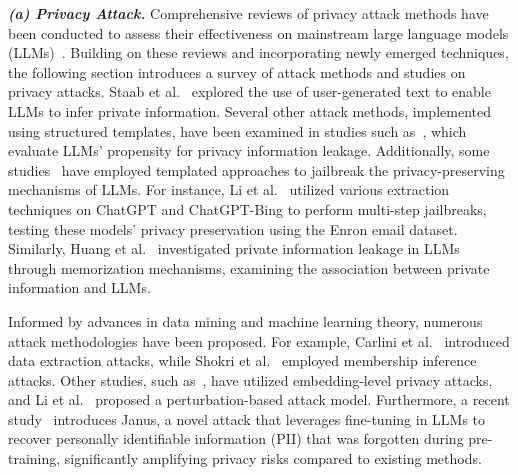 \textbf{\textit{(a) Privacy Attack.}} Comprehensive reviews of privacy attack methods have been conducted to assess their effectiveness on mainstream large language models (LLMs)~\cite{Das2024SecurityAP, Wang2024UniqueSA, Smith2023IdentifyingAM}. Building on these reviews and incorporating newly emerged techniques, the following section introduces a survey of attack methods and studies on privacy attacks. Staab et al.~\cite{Staab2023BeyondMV} explored the use of user-generated text to enable LLMs to infer private information. Several other attack methods, implemented using structured templates, have been examined in studies such as~\cite{Huang2022AreLP, Kim2023ProPILEPP, wang2023decodingtrust}, which evaluate LLMs' propensity for privacy information leakage. Additionally, some studies~\cite{Li2023MultistepJP, Deng2023JailbreakerAJ} have employed templated approaches to jailbreak the privacy-preserving mechanisms of LLMs. For instance, Li et al.~\cite{Li2023MultistepJP} utilized various extraction techniques on ChatGPT and ChatGPT-Bing to perform multi-step jailbreaks, testing these models' privacy preservation using the Enron email dataset. Similarly, Huang et al.~\cite{Huang2022AreLP} investigated private information leakage in LLMs through memorization mechanisms, examining the association between private information and LLMs.

Informed by advances in data mining and machine learning theory, numerous attack methodologies have been proposed. For example, Carlini et al.~\cite{carlini2021extracting} introduced data extraction attacks, while Shokri et al.~\cite{Shokri2016MembershipIA} employed membership inference attacks. Other studies, such as~\cite{10.1145/3372297.3417270}, have utilized embedding-level privacy attacks, and Li et al.~\cite{Li2023MoPeMP} proposed a perturbation-based attack model. Furthermore, a recent study~\cite{Chen2023TheJI} introduces Janus, a novel attack that leverages fine-tuning in LLMs to recover personally identifiable information (PII) that was forgotten during pre-training, significantly amplifying privacy risks compared to existing methods.



